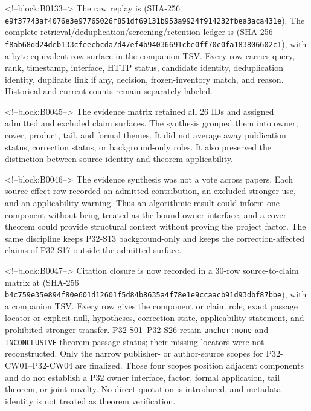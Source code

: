 \documentclass[11pt]{article}
\begin{document}
<!--block:B0133-->
\begingroup\sloppy
The raw replay is
 (SHA-256
\texttt{e9f37743\allowbreak{}af4076e3\allowbreak{}e9776502\allowbreak{}6f851df6\allowbreak{}9131b953\allowbreak{}a9924f91\allowbreak{}4232fbea\allowbreak{}3aca431e}).  The complete retrieval/deduplication/screening/retention
ledger is 
(SHA-256 \texttt{f8ab68dd\allowbreak{}24deb133\allowbreak{}cfeecbcd\allowbreak{}a7d47ef4\allowbreak{}b9403669\allowbreak{}1cbe0ff7\allowbreak{}0c0fa183\allowbreak{}806602c1}), with a byte-equivalent row surface in the companion
TSV.  Every row carries query, rank, timestamp, interface, HTTP status,
candidate identity, deduplication identity, duplicate link if any, decision,
frozen-inventory match, and reason.  Historical and current counts remain
separately labeled.
\par\endgroup

<!--block:B0045-->
The evidence matrix retained all 26 IDs and assigned admitted and
excluded claim surfaces. The synthesis grouped them into owner, cover,
product, tail, and formal themes. It did not average away publication
status, correction status, or background-only roles. It also preserved
the distinction between source identity and theorem applicability.

<!--block:B0046-->
The evidence synthesis was not a vote across papers. Each source-effect
row recorded an admitted contribution, an excluded stronger use, and an
applicability warning. Thus an algorithmic result could inform one
component without being treated as the bound owner interface, and a
cover theorem could provide structural context without proving the
project factor. The same discipline keeps P32-S13 background-only and
keeps the correction-affected claims of P32-S17 outside the admitted
surface.

<!--block:B0047-->
\begingroup\sloppy
Citation closure is now recorded in a 30-row source-to-claim matrix at
 (SHA-256
\texttt{b4c759e3\allowbreak{}5e894f80\allowbreak{}e601d126\allowbreak{}01f5d84b\allowbreak{}8635a4f7\allowbreak{}8e1e9cca\allowbreak{}acb91d93\allowbreak{}dbf87bbe}), with a companion TSV.  Every row gives the component or claim
role, exact passage locator or explicit null, hypotheses, correction state,
applicability statement, and prohibited stronger transfer.  P32-S01--P32-S26
retain \texttt{anchor:none} and \texttt{INCONCLUSIVE} theorem-passage status;
their missing locators were not reconstructed.  Only the narrow publisher- or
author-source scopes for P32-CW01--P32-CW04 are finalized.  Those four scopes
position adjacent components and do not establish a P32 owner interface, factor,
formal application, tail theorem, or joint novelty.  No direct quotation is
introduced, and metadata identity is not treated as theorem verification.
\par\endgroup
\end{document}

